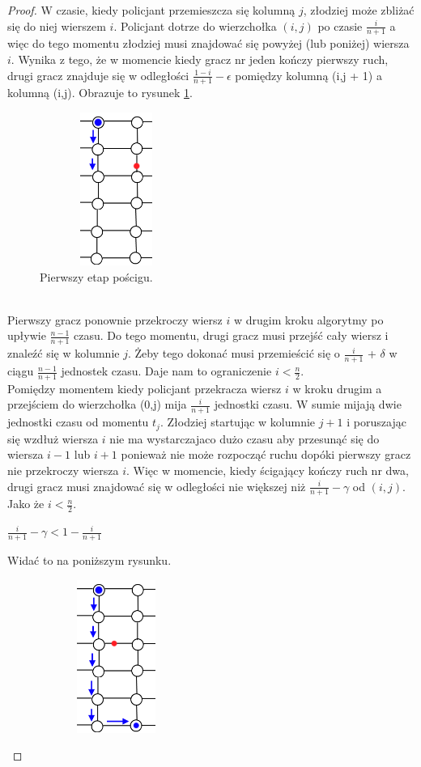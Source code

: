 \documentclass[brudnopis]{xmgr}
\theoremstyle{definition}
\begin{document}
\begin{proof}
	\indent W czasie, kiedy policjant przemieszcza się kolumną $j$, złodziej może zbliżać się do niej wierszem $i$. Policjant dotrze do wierzchołka $(i,j)$ po czasie $\frac{i}{n+1}$ a więc do tego momentu złodziej musi znajdować się powyżej (lub poniżej) wiersza $i$. Wynika z tego, że w momencie kiedy gracz nr jeden kończy pierwszy ruch, drugi gracz znajduje się w odległości $\frac{1-i}{n+1} - \epsilon$ pomiędzy kolumną (i,j + 1) a kolumną (i,j). Obrazuje to rysunek \ref{fig:pierwszy krok}.
	\begin{figure}[ht!]
	  \centering
	  \includegraphics[width=5cm,height=5cm]{rysunki/poscig_1.png}
	  \caption{Pierwszy etap pościgu.}
	  \label{fig:pierwszy krok}
	\end{figure}
	\\\indent Pierwszy gracz ponownie przekroczy wiersz $i$ w drugim kroku algorytmy po upływie $\frac{n-1}{n+1}$ czasu. Do tego momentu, drugi gracz musi przejść cały wiersz i znaleźć się w kolumnie $j$. Żeby tego dokonać musi przemieścić się o $\frac{i}{n+1}$ + $\delta$ w ciągu $\frac{n-1}{n+1}$ jednostek czasu. Daje nam to ograniczenie $i < \frac{n}{2}$.
	\\\indent Pomiędzy momentem kiedy policjant przekracza wiersz $i$ w kroku drugim a przejściem do wierzchołka (0,j) mija $\frac{i}{n+1}$ jednostki czasu. W sumie mijają dwie jednostki czasu od momentu $t_j$. Złodziej startując w kolumnie $j + 1$ i poruszając się wzdłuż wiersza $i$ nie ma wystarczajaco dużo czasu aby przesunąć się do wiersza $i - 1$ lub $i + 1$ ponieważ nie może rozpocząć ruchu dopóki pierwszy gracz nie przekroczy wiersza $i$. Więc w momencie, kiedy ścigający kończy ruch nr dwa, drugi gracz musi znajdować się w odległości nie większej niż $\frac{i}{n+1} - \gamma$ od $(i,j)$. Jako że $i < \frac{n}{2}$.
	\begin{center}
	$\frac{i}{n+1} - \gamma < 1 - \frac{i}{n+1}$
	\end{center}
	Widać to na poniższym rysunku.
	\begin{figure}[ht!]
	  \centering
	  \includegraphics[width=5cm,height=5cm]{rysunki/poscig_2.png}

\end{figure}
\end{proof}
\end{document}
